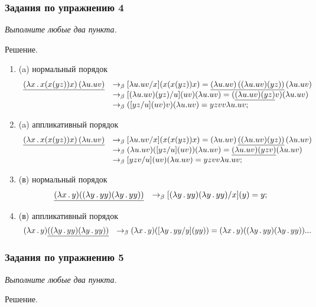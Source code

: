 \documentclass[12pt,a4paper]{article}
\begin{document}
\subsubsection*{Задания по упражнению 4}

\emph{Выполните любые два пункта.}

Решение.
\begin{enumerate}
\item
(a) нормальный порядок
\[
\begin{array}{ll}
\underline{(\lambda x\,.\, x(x(yz))x)\,(\lambda u.uv)} &\rightarrow_\beta [\lambda u.uv/x](x(x(yz))x) = \underline{(\lambda u.uv)\,((\lambda u.uv)(yz))}\,(\lambda u.uv) \\ &\rightarrow_\beta [(\lambda u.uv)(yz)/u](uv)(\lambda u.uv) = (\underline{(\lambda u.uv)(yz)}v)(\lambda u.uv) \\ &\rightarrow_\beta ([yz/u](uv)v)(\lambda u.uv) = yzvv\lambda u.uv ;\\
\end{array}
\]
\item
(a) аппликативный порядок
\[
\begin{array}{ll}
\underline{(\lambda x\,.\, x(x(yz))x)\,(\lambda u.uv)} &\rightarrow_\beta [\lambda u.uv/x](x(x(yz))x) = (\lambda u.uv)\,\underline{((\lambda u.uv)(yz))}\,(\lambda u.uv) \\ &\rightarrow_\beta (\lambda u.uv)([yz/u](uv))(\lambda u.uv) = \underline{(\lambda u.uv)(yzv)}(\lambda u.uv) \\ &\rightarrow_\beta [yzv/u](uv)(\lambda u.uv) = yzvv\lambda u.uv ;\\
\end{array}
\]
\item
(в) нормальный порядок
\[
\begin{array}{ll}
\underline{(\lambda x\,.\, y)((\lambda y\,.\, yy)(\lambda y\,.\, yy))} &\rightarrow_\beta [(\lambda y\,.\, yy)(\lambda y\,.\, yy)/x](y) = y;\\
\end{array}
\]
\item
(в) аппликативный порядок
\[
\begin{array}{ll}
(\lambda x\,.\, y)\underline{((\lambda y\,.\, yy)(\lambda y\,.\, yy))} &\rightarrow_\beta (\lambda x\,.\, y)([\lambda y\,.\, yy/y](yy)) = (\lambda x\,.\, y)((\lambda y\,.\, yy)(\lambda y\,.\, yy)) ...\\
\end{array}
\]
\end{enumerate}

\subsubsection*{Задания по упражнению 5}

\emph{Выполните любые два пункта.}

Решение.
\end{document}
